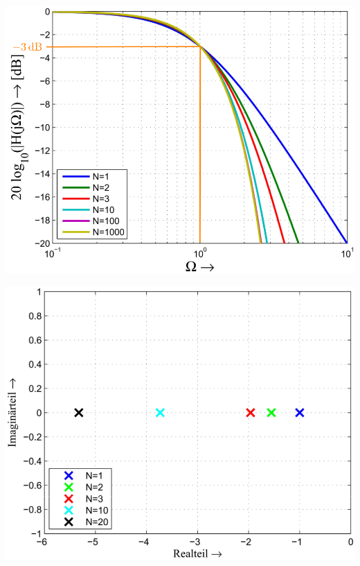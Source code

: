 \begin{minipage}[c]{0.4\columnwidth}
    \begin{center}
        \textbf{}
    \end{center}
    \includegraphics[width=\columnwidth]{images/filter_kritisch_gedaempft_normierter_amplitudengang.png}
\end{minipage}
\hfill
\begin{minipage}[c]{0.4\columnwidth}
    \begin{center}
        \textbf{}
    \end{center}
    \includegraphics[width=\columnwidth]{images/filter_kritisch_gedaempft_pollagen.png}
\end{minipage}



